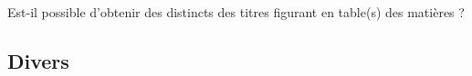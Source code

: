 \begin{dbfaq}{Est-il possible d'obtenir des  distincts
    des titres figurant en table(s) des matières ?}{}
\end{dbfaq}

\subsection{Divers}
\label{sec-divers}

